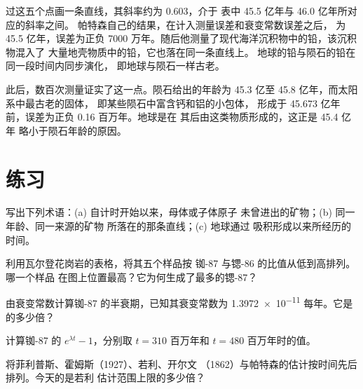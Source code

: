 过这五个点画一条直线，其斜率约为 0.603，介于
表中 45.5 亿年与 46.0 亿年所对应的斜率之间。
帕特森自己的结果，在计入测量误差和衰变常数误差之后，
为 45.5 亿年，误差为正负 7000 万年。随后他测量了现代海洋沉积物中的铅，该沉积物混入了
大量地壳物质中的铅，它也落在同一条直线上。
地球的铅与陨石的铅在同一段时间内同步演化，
即地球与陨石一样古老。

此后，数百次测量证实了这一点。陨石给出的年龄为
45.3 亿至 45.8 亿年，而太阳系中最古老的固体，
即某些陨石中富含钙和铝的小包体，
形成于 45.673 亿年前，误差为正负 0.16 百万年。地球是在
其后由这类物质形成的，这正是 45.4 亿年
略小于陨石年龄的原因。

\section{练习}

\begin{exercise}[$\star$]\label{exo:g12:age-of-the-earth:1}
写出下列术语：(a) 自计时开始以来，母体或子体原子
未曾进出的矿物；(b) 同一年龄、同一来源的矿物
所落在的那条直线；(c) 地球通过
吸积形成以来所经历的时间。
\end{exercise}

\begin{exercise}[$\star$]\label{exo:g12:age-of-the-earth:2}
利用瓦尔登花岗岩的表格，将其五个样品按
铷-87 与锶-86 的比值从低到高排列。哪一个样品
在图上位置最高？它为何生成了最多的锶-87？
\end{exercise}

\begin{exercise}[$\star$]\label{exo:g12:age-of-the-earth:3}
由衰变常数计算铷-87 的半衰期，已知其衰变常数为
\num{1.3972e-11} 每年。它是的多少倍？
\end{exercise}

\begin{exercise}[$\star$]\label{exo:g12:age-of-the-earth:4}
计算铷-87 的 $e^{\lambda t} - 1$，分别取 $t = 310$ 百万年和
$t = 480$ 百万年时的值。
\end{exercise}

\begin{exercise}[$\star$]\label{exo:g12:age-of-the-earth:5}
将菲利普斯、霍姆斯（1927）、若利、开尔文
（1862）与帕特森的估计按时间先后排列。今天的是若利
估计范围上限的多少倍？
\end{exercise}

